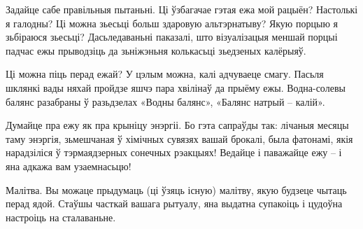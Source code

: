 Задайце сабе правільныя пытаньні.
Ці ўзбагачае гэтая ежа мой рацыён? Настолькі я галодны? Ці можна зьесьці больш здаровую альтэрнатыву? Якую порцыю я зьбіраюся зьесьці? Дасьледаваньні паказалі, што візуалізацыя меншай порцыі падчас ежы прыводзіць да зьніжэньня колькасьці зьедзеных калёрыяў.

Ці можна піць перад ежай?
У цэлым можна, калі адчуваеце смагу. Пасьля шклянкі вады няхай пройдзе яшчэ пара хвілінаў да прыёму ежы. Водна-солевы балянс разабраны ў разьдзелах «Водны балянс», «Балянс натрый – калій».

Думайце пра ежу як пра крыніцу энэргіі. Бо гэта сапраўды так: лічаныя месяцы таму энэргія, зьмешчаная ў хімічных сувязях вашай брокалі, была фатонамі, якія нарадзіліся ў тэрмаядзерных сонечных рэакцыях! Ведайце і паважайце ежу – і яна адкажа вам узаемнасьцю!

Малітва.
Вы можаце прыдумаць (ці ўзяць існую) малітву, якую будзеце чытаць перад ядой. Стаўшы часткай вашага рытуалу, яна выдатна супакоіць і цудоўна настроіць на сталаваньне.
